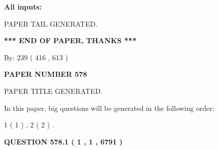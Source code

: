 \documentclass[12pt]{article}
\begin{document}
   
   
   
\noindent{}
   
   
   
   
\noindent\vspace{0.1in}\hspace{-0.08in} {\textbf{\Large{All inputs: }}}
   
   
   
   
   
   
 \vspace{0.2in}
 
   
   
\vspace{2.0in} PAPER TAIL GENERATED.
   
   
   
   
\vspace{1.0in} 
{\textbf{\large{ *** END OF PAPER, THANKS *** }}} 
   
   
\hspace{1.0in} By: 
 239 ( 416 ,  613 )
   
   
   
   
\newpage 
\setcounter{page}{ 
   578001 } 
   
   
   
   
 {\textbf{ \Large{ PAPER NUMBER  578  }}}
   
   
\vspace{0.2in}
   
   
   
   
   
   
   
   
 \vspace{0.2in}
 
 
 
 
   
   
 PAPER TITLE GENERATED.
   
   
   
\vspace{0.2in}
   
In this paper, big questions will be generated in the following order: 
   
   
   1 ( 1 )
 ,
   2 ( 2 )
 .
  
\vspace{0.2in}
  
{\textbf{\Large{QUESTION
578.1 
 ( 1 , 1 , 6791 )
}}}
  
\end{document}
